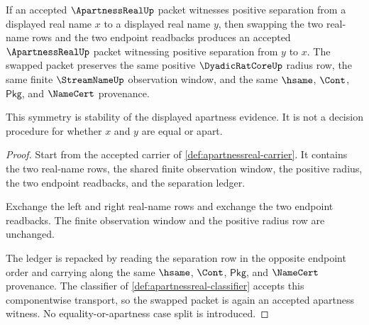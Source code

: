 \begin{theorem}
\label{thm:apartnessreal-symmetry-stability}
If an accepted $\ApartnessRealUp$ packet witnesses positive separation from a displayed real name $x$ to a displayed real name $y$, then swapping the two real-name rows and the two endpoint readbacks produces an accepted $\ApartnessRealUp$ packet witnessing positive separation from $y$ to $x$. The swapped packet preserves the same positive $\DyadicRatCoreUp$ radius row, the same finite $\StreamNameUp$ observation window, and the same $\hsame$, $\Cont$, $\mathsf{Pkg}$, and $\NameCert$ provenance.

This symmetry is stability of the displayed apartness evidence. It is not a decision procedure for whether $x$ and $y$ are equal or apart.
\end{theorem}
\begin{proof}
Start from the accepted carrier of \autoref{def:apartnessreal-carrier}. It contains the two real-name rows, the shared finite observation window, the positive radius, the two endpoint readbacks, and the separation ledger.

Exchange the left and right real-name rows and exchange the two endpoint readbacks. The finite observation window and the positive radius row are unchanged.

The ledger is repacked by reading the separation row in the opposite endpoint order and carrying along the same $\hsame$, $\Cont$, $\mathsf{Pkg}$, and $\NameCert$ provenance. The classifier of \autoref{def:apartnessreal-classifier} accepts this componentwise transport, so the swapped packet is again an accepted apartness witness. No equality-or-apartness case split is introduced.
\end{proof}

